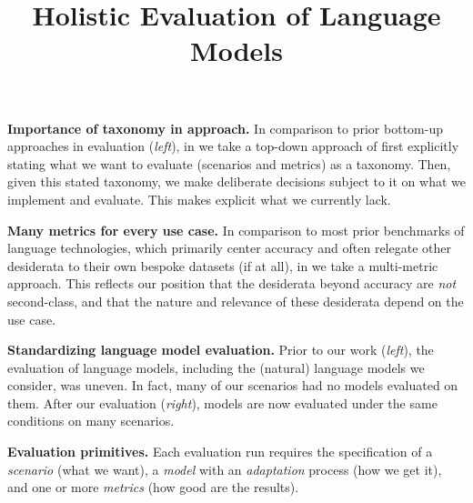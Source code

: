 \documentclass[screen, authorversion, acmsmall]{acmart}
\begin{document}
\title{Holistic Evaluation of Language Models}


\renewcommand{\shortauthors}{Center for Research on Foundation Models (CRFM)}

{\textbf{Importance of taxonomy in \benchmarkname approach.}
In comparison to prior bottom-up approaches in evaluation (\textit{left}), in \benchmarkname we take a top-down approach of first explicitly stating what we want to evaluate (\ie scenarios and metrics) as a taxonomy. Then, given this stated taxonomy, we make deliberate decisions subject to it on what we implement and evaluate. This makes explicit what we currently lack.}

{\textbf{Many metrics for every use case.}
In comparison to most prior benchmarks of language technologies, which primarily center accuracy and often relegate other desiderata to their own bespoke datasets (if at all), in \benchmarkname we take a multi-metric approach.
This reflects our position that the desiderata beyond accuracy are \textit{not} second-class, and that the nature and relevance of these desiderata depend on the use case.
}

{\textbf{Standardizing language model evaluation.} Prior to our work (\textit{left}), the evaluation of language models, including the \numtextmodels (natural) language models we consider, was uneven.
In fact, many of our \numcorescenarios \core scenarios had no models evaluated on them.
After our evaluation (\textit{right}), models are now evaluated under the same conditions on many scenarios.
}

{\textbf{Evaluation primitives.} Each evaluation run requires the specification of 
a \textit{scenario} (what we want), 
a \textit{model} with an \textit{adaptation} process (how we get it), 
and one or more \textit{metrics} (how good are the results).
}


\newpage
\end{document}
